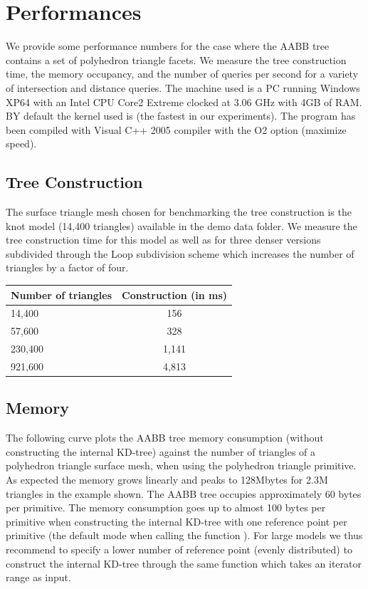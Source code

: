 \section{Performances}
\label{AABB_tree_section_performances}

We provide some performance numbers for the case where the AABB tree contains a set of polyhedron triangle facets. We measure the tree construction time, the memory occupancy, and the number of queries per second for a variety of intersection and distance queries. The machine used is a PC running Windows XP64 with an Intel CPU Core2 Extreme clocked at 3.06 GHz with 4GB of RAM. BY default the kernel used is  (the fastest in our experiments). The program has been compiled with Visual C++ 2005 compiler with the O2 option (maximize speed).

\subsection{Tree Construction}

The surface triangle mesh chosen for benchmarking the tree construction is the knot model (14,400 triangles) available in the demo data folder. We measure the tree construction time for this model as well as for three denser versions subdivided through the Loop subdivision scheme which increases the number of triangles by a factor of four.


\begin{tabular}{|l|c|}
  \hline
  Number of triangles & Construction (in ms)\\
  \hline
   14,400 &   156 \\
   57,600 &   328 \\
  230,400 & 1,141 \\
  921,600 & 4,813 \\
  \hline
\end{tabular}

\subsection{Memory}

The following curve plots the AABB tree memory consumption (without constructing the internal KD-tree) against the number of triangles of a polyhedron triangle surface mesh, when using the polyhedron triangle primitive. As expected the memory grows linearly and peaks to 128Mbytes for 2.3M triangles in the example shown. The AABB tree occupies approximately 60 bytes per primitive. The memory consumption goes up to almost 100 bytes per primitive when constructing the internal KD-tree with one reference point per primitive (the default mode when calling the function ). For large models we thus recommend to specify a lower number of reference point (evenly distributed) to construct the internal KD-tree through the same function which takes an iterator range as input.

